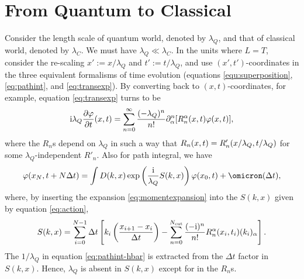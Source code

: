 \documentclass{book}
\newcommand{\assign}{:=}
\newcommand{\mathi}{\mathrm{i}}
\newcommand{\tmop}[1]{\ensuremath{\operatorname{#1}}}
\begin{document}
\section{From Quantum to Classical}\label{section:From Quantum to Classical}

Consider the length scale of quantum world, denoted by $\lambda_Q$, and that
of classical world, denoted by $\lambda_C$. We must have $\lambda_Q \ll
\lambda_C$. In the units where $L = T$, consider the re-scaling $x' \assign x
/ \lambda_Q$ and $t' \assign t / \lambda_Q$, and use $(x', t')$-coordinates in
the three equivalent formalisms of time evolution (equations
\ref{equ:superposition}, \ref{eq:pathint}, and \ref{eq:transexp}). By
converting back to $(x, t)$-coordinates, for example, equation
\ref{eq:transexp} turns to be
\begin{equation}
  \mathi \lambda_Q  \frac{\partial \varphi}{\partial t}  (x, t) = \sum_{n =
  0}^{\infty} \frac{(- \lambda_Q)^n}{n!} \partial^n_{\alpha}
  [{\color[HTML]{000000}R^{\alpha}_n (x, t)} \varphi (x, t)],
  \label{eq:transexp-hbar}
\end{equation}
where the $R_n$s depend on $\lambda_Q$ in such a way that
${\color[HTML]{000000}R_n  (x, t)} = {\color[HTML]{000000}R'_n  (x /
\lambda_Q, t / \lambda_Q)}$ for some $\lambda_Q$-independent $R'_n$. Also for
path integral, we have
\begin{equation}
  \varphi (x_N, t + N \Delta t) = \int D (k, x) \exp \left(
  \frac{\mathi}{\lambda_Q} S (k, x) \right) \varphi (x_0, t) + \omicron
  (\Delta t), \label{eq:pathint-hbar}
\end{equation}
where, by inserting the expansion \ref{eq:momentexpansion} into the $S (k, x)$
given by equation \ref{eq:action},
\[ S (k, x) = \sum_{i = 0}^{N - 1} \Delta t \left[ k_i \left( \frac{x_{i + 1}
   - x_i}{\Delta t} \right) - \sum_{n = 0}^{N_{\tmop{cut}}} \frac{(-
   \mathi)^n}{n!} {\color[HTML]{000000}R^{\alpha}_n (x_i, t_i)} (k_i)_{\alpha}
   \right] . \]
The $1 / \lambda_Q$ in equation \ref{eq:pathint-hbar} is extracted from the
$\Delta t$ factor in $S (k, x)$. Hence, $\lambda_Q$ is absent in $S (k, x)$
except for in the $R_n$s.
\end{document}
